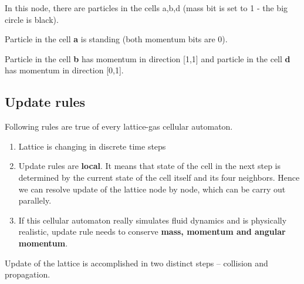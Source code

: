 In this node, there are particles in the cells a,b,d (mass bit is set to 1 - the big circle is black).

Particle in the cell \textbf{a} is standing (both momentum bits are 0).

Particle in the cell \textbf{b} has momentum in direction [1,1] and particle in the cell \textbf{d} has momentum in direction [0,1].

\subsection{Update rules}
Following rules are true of every lattice-gas cellular automaton.

\begin{enumerate}
\item Lattice is changing in discrete time steps
\item Update rules are \textbf{local}. It means that state of the cell in the next step is determined by the current state of the cell itself and its four neighbors. Hence we can resolve update of the lattice node by node, which can be carry out parallely.
\item If this cellular automaton really simulates fluid dynamics and is physically realistic, update rule needs to conserve \textbf{mass, momentum and angular momentum}.
\end{enumerate}

Update of the lattice is accomplished in two distinct steps -- collision and propagation.

